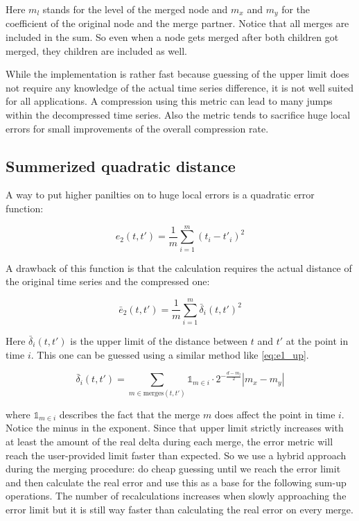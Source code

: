 Here $m_l$ stands for the level of the merged node and $m_x$ and $m_y$ for the coefficient of the original node and the merge partner. Notice that all merges are included in the sum. So even when a node gets merged after both children got merged, they children are included as well.

While the implementation is rather fast because guessing of the upper limit does not require any knowledge of the actual time series difference, it is not well suited for all applications. A compression using this metric can lead to many jumps within the decompressed time series. Also the metric tends to sacrifice huge local errors for small improvements of the overall compression rate.


\subsection{Summerized quadratic distance}
\label{ssec:algorithm:error:quadratic}

A way to put higher panilties on to huge local errors is a quadratic error function:

\begin{equation}\label{eq:e2}
    e_2\left(t, t'\right) = \frac{1}{m} \sum_{i=1}^m \left(t_i - t'_i\right)^2
\end{equation}

A drawback of this function is that the calculation requires the actual distance of the original time series and the compressed one:

\begin{equation}\label{eq:e2_up}
    \bar{e}_2\left(t, t'\right) = \frac{1}{m} \sum_{i=1}^m \bar{\delta}_i(t, t')^2
\end{equation}

Here $\bar{\delta}_i(t, t')$ is the upper limit of the distance between $t$ and $t'$ at the point in time $i$. This one can be guessed using a similar method like \autoref{eq:e1_up}.

\begin{equation}\label{eq:delta_up}
    \bar{\delta}_i\left(t, t'\right) = \sum_{m \in \mathrm{merges}(t, t')} \mathbb{1}_{m \in i} \cdot 2^{-\frac{d - m_l}{2}} \left|m_x - m_y\right|
\end{equation}

where $\mathbb{1}_{m \in i}$ describes the fact that the merge $m$ does affect the point in time $i$. Notice the minus in the exponent. Since that upper limit strictly increases with at least the amount of the real delta during each merge, the error metric will reach the user-provided limit faster than expected. So we use a hybrid approach during the merging procedure: do cheap guessing until we reach the error limit and then calculate the real error and use this as a base for the following sum-up operations. The number of recalculations increases when slowly approaching the error limit but it is still way faster than calculating the real error on every merge.


